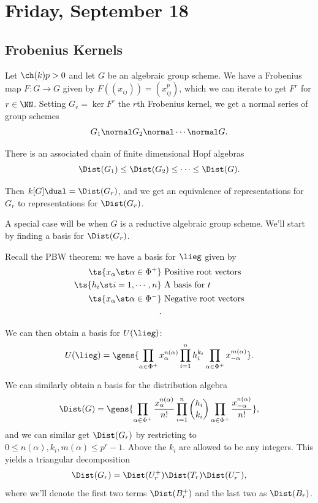 \hypertarget{friday-september-18}{%
\section{Friday, September 18}\label{friday-september-18}}

\hypertarget{frobenius-kernels-1}{%
\subsection{Frobenius Kernels}\label{frobenius-kernels-1}}

Let \(\ch(k) p > 0\) and let \(G\) be an algebraic group scheme. We have
a Frobenius map \(F:G\to G\) given by \(F((x_{ij})) = (x_{ij}^p)\),
which we can iterate to get \(F^r\) for \(r\in \NN\). Setting
\(G_r = \ker F^r\) the \(r\)th Frobenius kernel, we get a normal series
of group schemes
\begin{align*}  
G_1 \normal G_2 \normal \cdots \normal G
.\end{align*}

There is an associated chain of finite dimensional Hopf algebras
\begin{align*}  
\Dist(G_1) \leq \Dist(G_2) \leq \cdots \leq \Dist(G)
.\end{align*}

Then \(k[G]\dual = \Dist(G_r)\), and we get an equivalence of
representations for \(G_r\) to representations for \(\Dist(G_r)\).

A special case will be when \(G\) is a reductive algebraic group scheme.
We'll start by finding a basis for \(\Dist(G_r)\).

Recall the PBW theorem: we have a basis for \(\lieg\) given by
\begin{align*}  
\ts{x_\alpha \st \alpha\in \Phi^+ } &\text{ Positive root vectors} \\
\ts{h_i \st i=1,\cdots, n} &\text{ A basis for } t \\
\ts{x_\alpha \st \alpha\in \Phi^- } &\text{ Negative root vectors} \\
.\end{align*}

We can then obtain a basis for \(U(\lieg)\):
\begin{align*}  
U(\lieg) = \gens{ \prod_{\alpha\in\Phi^+} x_\alpha^{n(\alpha)} \prod_{i=1}^n h_i^{k_i} \prod_{\alpha\in\Phi^+} x_{-\alpha}^{m(\alpha)}  }
.\end{align*}

We can similarly obtain a basis for the distribution algebra
\begin{align*}  
\Dist(G) = \gens{ 
\prod_{\alpha\in\Phi^+} { x_{\alpha}^{n(\alpha)} \over n!} 
\prod_{i=1}^n {h_i \choose k_i} 
\prod_{\alpha\in\Phi^+} { x_{-\alpha}^{n(\alpha)} \over n!} 
}
,\end{align*} and we can similar get \(\Dist(G_r)\) by restricting to
\(0\leq n(\alpha), k_i, m(\alpha) \leq p^r - 1\). Above the \(k_i\) are
allowed to be any integers. This yields a triangular decomposition
\begin{align*}  
\Dist(G_r) = \Dist(U_r^+) \Dist(T_r) \Dist(U_r^-)
,\end{align*} where we'll denote the first two terms \(\Dist(B_r^+)\)
and the last two as \(\Dist(B_r)\).


